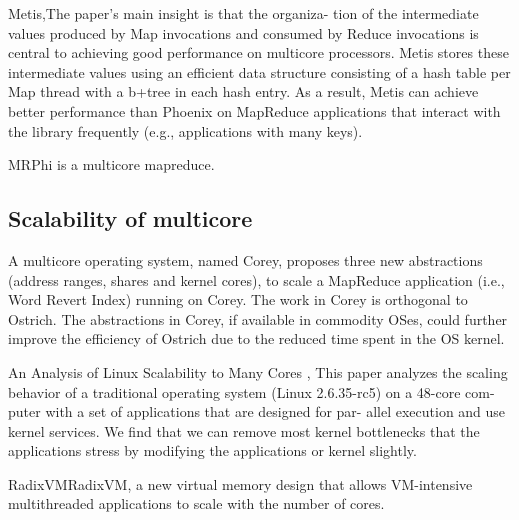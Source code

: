 Metis\cite{mao2010metis},The paper’s main insight is that the organiza-
tion of the intermediate values produced by Map invocations and consumed by Reduce invocations is central
to achieving good performance on multicore processors.
Metis stores these intermediate values using an efficient
data structure consisting of a hash table per Map thread
with a b+tree in each hash entry. As a result, Metis can
achieve better performance than Phoenix on MapReduce
applications that interact with the library frequently (e.g.,
applications with many keys).

MRPhi\cite{} is a multicore mapreduce.

\subsection{Scalability of multicore}
A multicore operating system, named Corey\cite{boyd2008corey}, proposes three
new abstractions (address ranges, shares and kernel cores), to scale
a MapReduce application (i.e., Word Revert Index) running on Corey.
The work in Corey is orthogonal to Ostrich. The abstractions in
Corey, if available in commodity OSes, could further improve the
efficiency of Ostrich due to the reduced time spent in the OS kernel.
	
An Analysis of Linux Scalability to Many Cores \cite{Boyd2010An},
This paper analyzes the scaling behavior of a traditional
operating system (Linux 2.6.35-rc5) on a 48-core com-
puter with a set of applications that are designed for par-
allel execution and use kernel services. We find that we
can remove most kernel bottlenecks that the applications
stress by modifying the applications or kernel slightly.

RadixVM\cite{Clements2013RadixVM}RadixVM, a new virtual memory design
that allows VM-intensive multithreaded applications to scale
with the number of cores.


